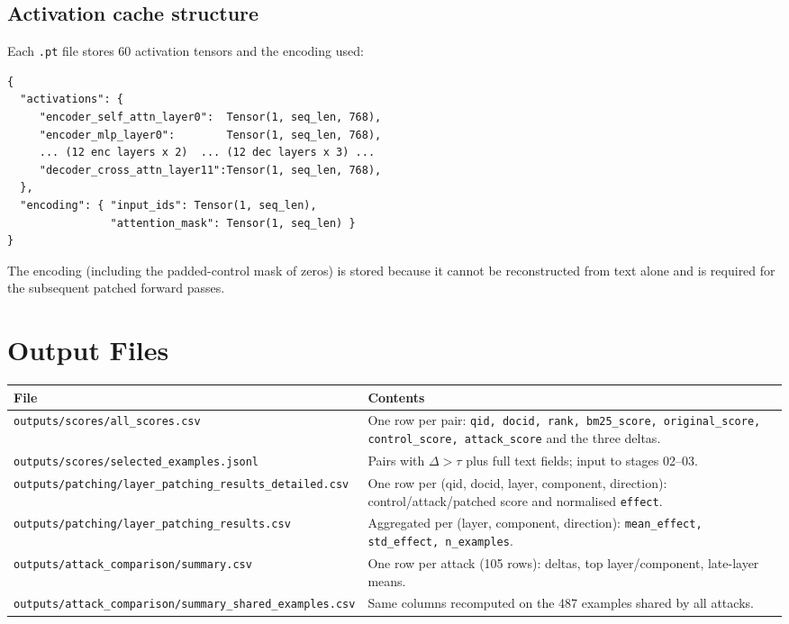 \documentclass[11pt]{article}
\begin{document}
\subsection{Activation cache structure}

Each \texttt{.pt} file stores 60 activation tensors and the encoding used:
\begin{lstlisting}
{
  "activations": {
     "encoder_self_attn_layer0":  Tensor(1, seq_len, 768),
     "encoder_mlp_layer0":        Tensor(1, seq_len, 768),
     ... (12 enc layers x 2)  ... (12 dec layers x 3) ...
     "decoder_cross_attn_layer11":Tensor(1, seq_len, 768),
  },
  "encoding": { "input_ids": Tensor(1, seq_len),
                "attention_mask": Tensor(1, seq_len) }
}
\end{lstlisting}
The encoding (including the padded-control mask of zeros) is stored because it
cannot be reconstructed from text alone and is required for the subsequent
patched forward passes.

\section{Output Files}

\begin{longtable}{p{}p{}}
\toprule
File & Contents \\
\midrule
\endhead
\texttt{outputs/scores/all\_scores.csv} &
  One row per pair: \texttt{qid, docid, rank, bm25\_score, original\_score,
  control\_score, attack\_score} and the three deltas. \\
\texttt{outputs/scores/selected\_examples.jsonl} &
  Pairs with $\Delta>\tau$ plus full text fields; input to stages 02--03. \\
\texttt{outputs/patching/layer\_patching\_results\_detailed.csv} &
  One row per (qid, docid, layer, component, direction):
  control/attack/patched score and normalised \texttt{effect}. \\
\texttt{outputs/patching/layer\_patching\_results.csv} &
  Aggregated per (layer, component, direction):
  \texttt{mean\_effect, std\_effect, n\_examples}. \\
\texttt{outputs/attack\_comparison/summary.csv} &
  One row per attack (105 rows): deltas, top layer/component, late-layer means. \\
\texttt{outputs/attack\_comparison/summary\_shared\_examples.csv} &
  Same columns recomputed on the 487 examples shared by all attacks. \\
\bottomrule
\end{longtable}
\end{document}
